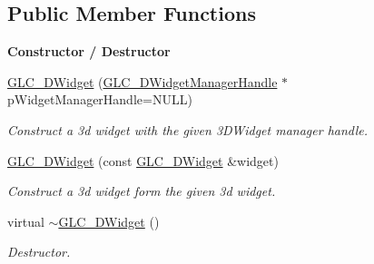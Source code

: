 \subsection*{Public Member Functions}
\begin{Indent}{\bf Constructor / Destructor}\par
\begin{DoxyCompactItemize}
\item 
\hyperlink{class_g_l_c__3_d_widget_a11449c545690988219d81e1b8074ae1e}{G\-L\-C\-\_\-D\-Widget} (\hyperlink{class_g_l_c__3_d_widget_manager_handle}{G\-L\-C\-\_\-D\-Widget\-Manager\-Handle} $\ast$p\-Widget\-Manager\-Handle=N\-U\-L\-L)
\begin{DoxyCompactList}\small\item\em Construct a 3d widget with the given 3\-D\-Widget manager handle. \end{DoxyCompactList}\item 
\hyperlink{class_g_l_c__3_d_widget_acb07f98c79ea24c70e3028b72b27a299}{G\-L\-C\-\_\-D\-Widget} (const \hyperlink{class_g_l_c__3_d_widget}{G\-L\-C\-\_\-D\-Widget} \&widget)
\begin{DoxyCompactList}\small\item\em Construct a 3d widget form the given 3d widget. \end{DoxyCompactList}\item 
virtual \hyperlink{class_g_l_c__3_d_widget_a84f42e9cfd8996cbd93ca051ba7a60ad}{$\sim$\-G\-L\-C\-\_\-D\-Widget} ()
\begin{DoxyCompactList}\small\item\em Destructor. \end{DoxyCompactList}\end{DoxyCompactItemize}
\end{Indent}
